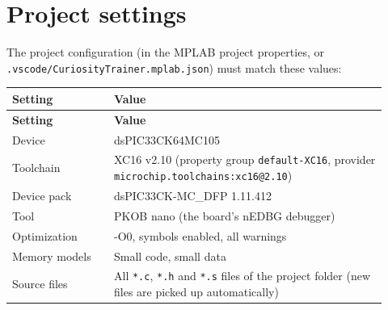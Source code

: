 \documentclass[
  11pt,
  letterpaper,
  oneside,
  DIV=13,               %
  parskip=half,          %
  headings=normal,
  chapterprefix=false,
  toc=listof,
  numbers=noenddot,
]{scrbook}
\begin{document}
\section{Project settings}

The project configuration (in the MPLAB project properties, or \texttt{.\allowbreak{}vscode/\allowbreak{}CuriosityTrainer.\allowbreak{}mplab.\allowbreak{}json}) must match these values:
\begin{longtable}{>{\raggedright\arraybackslash}p{0.25\linewidth}>{\raggedright\arraybackslash}p{0.67\linewidth}}
\toprule
\textbf{Setting} & \textbf{Value} \\
\midrule
\endfirsthead
\toprule
\textbf{Setting} & \textbf{Value} \\
\midrule
\endhead
\bottomrule
\endlastfoot
Device & dsPIC33CK64MC105 \\
Toolchain & XC16 v2.10 (property group \texttt{default-\allowbreak{}XC16}, provider \texttt{microchip.\allowbreak{}toolchains:xc16@2.\allowbreak{}10}) \\
Device pack & dsPIC33CK-MC\_DFP 1.11.412 \\
Tool & PKOB nano (the board's nEDBG debugger) \\
Optimization & -O0, symbols enabled, all warnings \\
Memory models & Small code, small data \\
Source files & All \texttt{*.\allowbreak{}c}, \texttt{*.\allowbreak{}h} and \texttt{*.\allowbreak{}s} files of the project folder (new files are picked up automatically) \\
\end{longtable}
\end{document}
